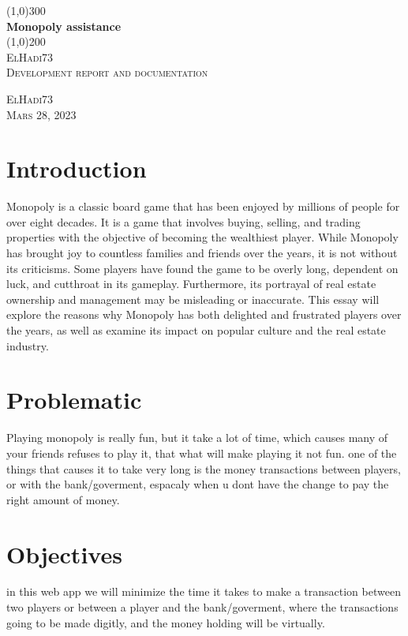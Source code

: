 \documentclass{article}
\begin{document}
\begin{titlepage}
	\begin{center}
		\line(1,0){300}\\
		[0.25in]
		\huge{\bfseries Monopoly assistance}\\
		[2mm]
		\line(1,0){200}\\
		[1.5cm]
		\textsc{\LARGE ElHadi73}\\
		[0.75cm]
		\textsc{\Large Development report and documentation}\\
		[10cm]
	\end{center}
	\begin{flushright}
		\textsc{\large ElHadi73\\
		Mars 28, 2023\\}
	\end{flushright}
\end{titlepage}

\section{Introduction}\label{sec:intro}
Monopoly is a classic board game that has been enjoyed by millions of people for over eight decades. It is a game that involves buying, selling, and trading properties with the objective of becoming the wealthiest player. While Monopoly has brought joy to countless families and friends over the years, it is not without its criticisms. Some players have found the game to be overly long, dependent on luck, and cutthroat in its gameplay. Furthermore, its portrayal of real estate ownership and management may be misleading or inaccurate. This essay will explore the reasons why Monopoly has both delighted and frustrated players over the years, as well as examine its impact on popular culture and the real estate industry.

\section{Problematic}\label{sec:prbm}
Playing monopoly is really fun, but it take a lot of time, which causes many of your friends refuses to play it, that what will make playing it not fun.
one of the things that causes it to take very long is the money transactions between players, or with the bank/goverment, espacaly when u dont have the change to pay the right amount of money.

\section{Objectives}\label{sec:obj}
in this web app we will minimize the time it takes to make a transaction between two players or between a player and the bank/goverment, where the transactions going to be made digitly, and the money holding will be virtually.
\end{document}
